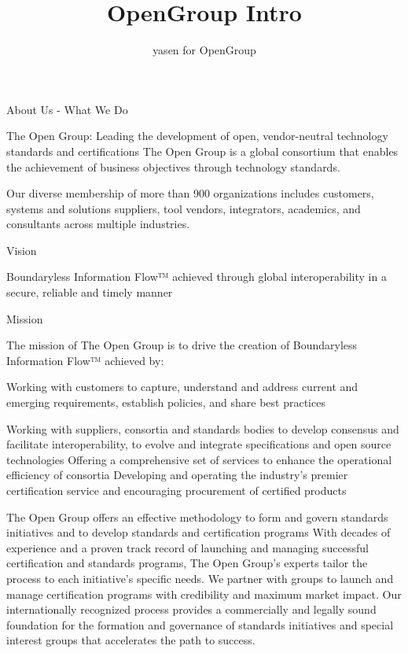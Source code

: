 \documentclass{report}
\title{OpenGroup Intro}
\author{yasen for OpenGroup}
\begin{document}
	
	\maketitle

	\pagestyle{fancy}
		\fancyhead{} %
		\fancyfoot{} %
		\fancyfoot[LE,RO]{\thepage}
	
	\newpage
	
	
	About Us - What We Do
	
	The Open Group: Leading the development of open, vendor-neutral technology standards and certifications
	The Open Group is a global consortium that enables the achievement of business objectives through technology standards.
	
	Our diverse membership of more than 900 organizations includes customers, systems and solutions suppliers, tool vendors, integrators, academics, and consultants across multiple industries.
	
	\newpage
	
	Vision
	
	Boundaryless Information Flow™ achieved through global interoperability in a secure, reliable and timely manner
	
	\newpage
	
	Mission
	
	The mission of The Open Group is to drive the creation of Boundaryless Information Flow™ achieved by:
	
	Working with customers to capture, understand and address current and emerging requirements, establish policies, and share best practices
	
	
	Working with suppliers, consortia and standards bodies to develop consensus and facilitate interoperability, to evolve and integrate specifications and open source technologies
	Offering a comprehensive set of services to enhance the operational efficiency of consortia
	Developing and operating the industry's premier certification service and encouraging procurement of certified products
	
	The Open Group offers an effective methodology to form and govern standards initiatives and to develop standards and certification programs
	With decades of experience and a proven track record of launching and managing successful certification and standards programs, The Open Group’s experts tailor the process to each initiative’s specific needs. We partner with groups to launch and manage certification programs with credibility and maximum market impact. Our internationally recognized process provides a commercially and legally sound foundation for the formation and governance of standards initiatives and special interest groups that accelerates the path to success.
	
\end{document}
